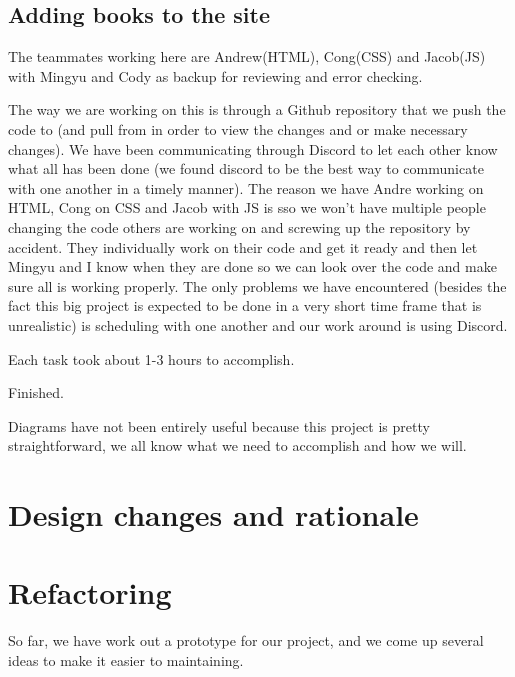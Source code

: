 \documentclass[12pt]{article}
\begin{document}
		\subsection{Adding books to the site}
		\begin{iterate}

		\item The teammates working here are Andrew(HTML), Cong(CSS) and Jacob(JS) with Mingyu and Cody as backup for reviewing and error checking.

		\item The way we are working on this is through a Github repository that we push the code to (and pull from in order to view the changes and or make necessary changes).  We have been communicating through Discord to let each other know what all has been done (we found discord to be the best way to communicate with one another in a timely manner).  The reason we have Andre working on HTML, Cong on CSS and Jacob with JS is sso we won’t have multiple people changing the code others are working on and screwing up the repository by accident.  They individually work on their code and get it ready and then let Mingyu and I know when they are done so we can look over the code and make sure all is working properly.  The only problems we have encountered (besides the fact this big project is expected to be done in a very short time frame that is unrealistic) is scheduling with one another and our work around is using Discord.

		\item Each task took about 1-3 hours to accomplish.

		\item Finished.

		\item Diagrams have not been entirely useful because this project is pretty straightforward, we all know what we need to accomplish and how we will.

		\end{iterate}



	\section{Design changes and rationale}
	




	\section{Refactoring}
		So far, we have work out a prototype for our project, and we come up several ideas to make it easier to maintaining.
\end{document}
